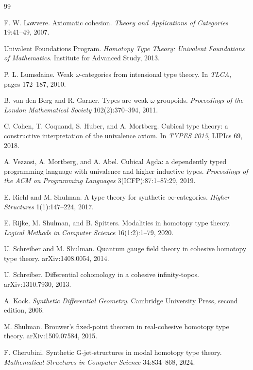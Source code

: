 \documentclass{lmcs}
\theoremstyle{plain}
\theoremstyle{definition}
\theoremstyle{remark}
\begin{document}
\begin{thebibliography}{99}

F. W. Lawvere.
Axiomatic cohesion.
\emph{Theory and Applications of Categories} 19:41--49, 2007.

Univalent Foundations Program.
\emph{Homotopy Type Theory: Univalent Foundations of Mathematics}.
Institute for Advanced Study, 2013.

P. L. Lumsdaine.
Weak $\omega$-categories from intensional type theory.
In \emph{TLCA}, pages 172--187, 2010.

B. van den Berg and R. Garner.
Types are weak $\omega$-groupoids.
\emph{Proceedings of the London Mathematical Society} 102(2):370--394, 2011.

C. Cohen, T. Coquand, S. Huber, and A. Mortberg.
Cubical type theory: a constructive interpretation of the univalence axiom.
In \emph{TYPES 2015}, LIPIcs 69, 2018.

A. Vezzosi, A. Mortberg, and A. Abel.
Cubical Agda: a dependently typed programming language with univalence and higher inductive types.
\emph{Proceedings of the ACM on Programming Languages} 3(ICFP):87:1--87:29, 2019.

E. Riehl and M. Shulman.
A type theory for synthetic $\infty$-categories.
\emph{Higher Structures} 1(1):147--224, 2017.

E. Rijke, M. Shulman, and B. Spitters.
Modalities in homotopy type theory.
\emph{Logical Methods in Computer Science} 16(1:2):1--79, 2020.

U. Schreiber and M. Shulman.
Quantum gauge field theory in cohesive homotopy type theory.
arXiv:1408.0054, 2014.

U. Schreiber.
Differential cohomology in a cohesive infinity-topos.
arXiv:1310.7930, 2013.

A. Kock.
\emph{Synthetic Differential Geometry}.
Cambridge University Press, second edition, 2006.

M. Shulman.
Brouwer's fixed-point theorem in real-cohesive homotopy type theory.
arXiv:1509.07584, 2015.

F. Cherubini.
Synthetic G-jet-structures in modal homotopy type theory.
\emph{Mathematical Structures in Computer Science} 34:834--868, 2024.


\end{thebibliography}
\end{document}
